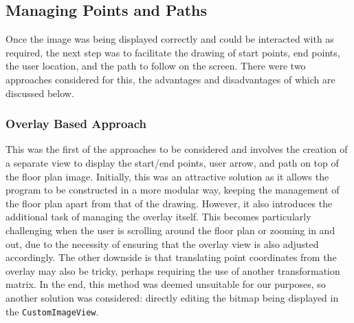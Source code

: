 \documentclass[main.tex]{subfiles}
\begin{document}
        \subsection*{Managing Points and Paths}
            Once the image was being displayed correctly and could be interacted with as required, the next step was to facilitate the drawing of start points, end points, the user location,
            and the path to follow on the screen. There were two approaches considered for this, the advantages and disadvantages of which are discussed below.
                \subsubsection*{Overlay Based Approach}
                    This was the first of the approaches to be considered and involves the creation of a separate view to display the start/end points, user arrow, and path on top
                    of the floor plan image. Initially, this was an attractive solution as it allows the program to be constructed in a more modular way, keeping the management of the
                    floor plan apart from that of the drawing. However, it also introduces the additional task of managing the overlay itself. This becomes particularly challenging
                    when the user is scrolling around the floor plan or zooming in and out, due to the necessity of ensuring that the overlay view is also adjusted accordingly.
                    The other downside is that translating point coordinates from the overlay may also be tricky, perhaps requiring the use of another transformation matrix.
                    In the end, this method was deemed unsuitable for our purposes, so another solution was considered: directly editing the bitmap being displayed in the
                    \texttt{CustomImageView}.
\end{document}
